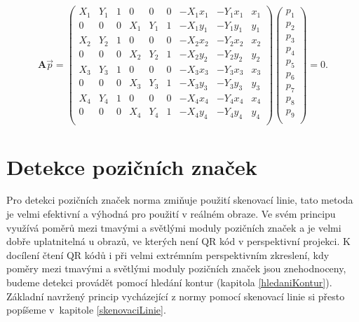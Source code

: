 \begin{equation}
  \mathbf{A} \vec{p} =
  \left(
    \begin{array}{ccccccccc}
      X_{1} & Y_{1} & 1 & 0 & 0 & 0 & -X_{1} x_{1} & -Y_{1} x_{1} & x_{1} \\
      0 & 0 & 0 & X_{1} & Y_{1} & 1 & -X_{1} y_{1} & -Y_{1} y_{1} & y_{1} \\
      X_{2} & Y_{2} & 1 & 0 & 0 & 0 & -X_{2} x_{2} & -Y_{2} x_{2} & x_{2} \\
      0 & 0 & 0 & X_{2} & Y_{2} & 1 & -X_{2} y_{2} & -Y_{2} y_{2} & y_{2} \\
      X_{3} & Y_{3} & 1 & 0 & 0 & 0 & -X_{3} x_{3} & -Y_{3} x_{3} & x_{3} \\
      0 & 0 & 0 & X_{3} & Y_{3} & 1 & -X_{3} y_{3} & -Y_{3} y_{3} & y_{3} \\
      X_{4} & Y_{4} & 1 & 0 & 0 & 0 & -X_{4} x_{4} & -Y_{4} x_{4} & x_{4} \\
      0 & 0 & 0 & X_{4} & Y_{4} & 1 & -X_{4} y_{4} & -Y_{4} y_{4} & y_{4} \\
    \end{array}
  \right)
  \left(
    \begin{array}{c}
      p_{1} \\
      p_{2} \\
      p_{3} \\
      p_{4} \\
      p_{5} \\
      p_{6} \\
      p_{7} \\
      p_{8} \\
      p_{9} \\
    \end{array}
  \right)
  = 0\mbox{.}
\end{equation}

\section{Detekce pozičních značek}
\label{detekcePozicnichZnacek}

Pro detekci pozičních značek norma zmiňuje použití skenovací linie, tato metoda
je velmi efektivní a výhodná pro použití v reálném obraze. Ve svém principu 
využívá poměrů mezi tmavými a světlými moduly pozičních značek a je velmi dobře
uplatnitelná u obrazů, ve kterých není QR kód v perspektivní projekci. K
docílení čtení QR kódů i při velmi extrémním perspektivním zkreslení, kdy poměry
mezi tmavými a světlými moduly pozičních značek jsou znehodnoceny, budeme
detekci provádět pomocí hledání kontur (kapitola \ref{hledaniKontur}). Základní
navržený princip vycházející z normy pomocí skenovací linie si přesto popíšeme
v~kapitole \ref{skenovaciLinie}.

